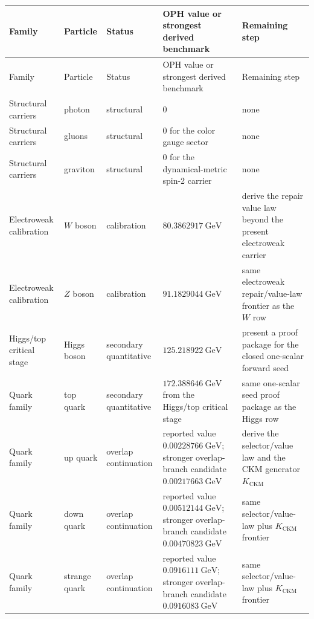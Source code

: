 \documentclass[11pt]{article}
\begin{document}
\begin{longtable}{@{}>{\raggedright\arraybackslash}p{}>{\raggedright\arraybackslash}p{}>{\raggedright\arraybackslash}p{}>{\raggedright\arraybackslash}p{}>{\raggedright\arraybackslash}p{}@{}}
\toprule
Family & Particle & Status & OPH value or strongest derived benchmark & Remaining step \\
\midrule
\endfirsthead
\toprule
Family & Particle & Status & OPH value or strongest derived benchmark & Remaining step \\
\midrule
\endhead
\bottomrule
\endfoot
Structural carriers & photon & structural & \(0\) & none \\
Structural carriers & gluons & structural & \(0\) for the color gauge sector & none \\
Structural carriers & graviton & structural & \(0\) for the dynamical-metric spin-2 carrier & none \\
Electroweak calibration & \(W\) boson & calibration & \(80.3862917~\mathrm{GeV}\) & derive the repair value law beyond the present electroweak carrier \\
Electroweak calibration & \(Z\) boson & calibration & \(91.1829044~\mathrm{GeV}\) & same electroweak repair/value-law frontier as the \(W\) row \\
Higgs/top critical stage & Higgs boson & secondary quantitative & \(125.218922~\mathrm{GeV}\) & present a proof package for the closed one-scalar forward seed \\
Quark family & top quark & secondary quantitative & \(172.388646~\mathrm{GeV}\) from the Higgs/top critical stage & same one-scalar seed proof package as the Higgs row \\
Quark family & up quark & overlap continuation & reported value \(0.00228766~\mathrm{GeV}\); stronger overlap-branch candidate \(0.00217663~\mathrm{GeV}\) & derive the selector/value law and the CKM generator \(K_{\mathrm{CKM}}\) \\
Quark family & down quark & overlap continuation & reported value \(0.00512144~\mathrm{GeV}\); stronger overlap-branch candidate \(0.00470823~\mathrm{GeV}\) & same selector/value-law plus \(K_{\mathrm{CKM}}\) frontier \\
Quark family & strange quark & overlap continuation & reported value \(0.0916111~\mathrm{GeV}\); stronger overlap-branch candidate \(0.0916083~\mathrm{GeV}\) & same selector/value-law plus \(K_{\mathrm{CKM}}\) frontier \\

\end{longtable}
\end{document}
